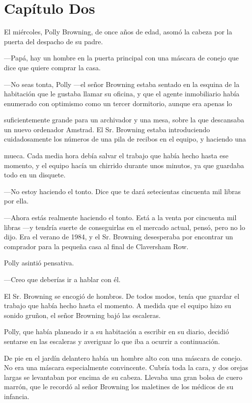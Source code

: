 \chapter*{Capítulo Dos} 

El miércoles, Polly Browning, de once años de edad, asomó la cabeza por la puerta del despacho de su padre.

---Papá, hay un hombre en la puerta principal con una máscara de conejo que dice que quiere comprar la casa.

---No seas tonta, Polly ---el señor Browning estaba sentado en la esquina de la habitación que le gustaba llamar su oficina, y que el agente inmobiliario había enumerado con optimismo como un tercer dormitorio, aunque era apenas lo

suficientemente grande para un archivador y una mesa, sobre la que descansaba un nuevo ordenador Amstrad. El Sr. Browning estaba introduciendo cuidadosamente los números de una pila de recibos en el equipo, y haciendo una

mueca. Cada media hora debía salvar el trabajo que había hecho hasta ese momento, y el equipo hacía un chirrido durante unos minutos, ya que guardaba todo en un disquete.

---No estoy haciendo el tonto. Dice que te dará setecientas cincuenta mil libras por ella.

---Ahora estás realmente haciendo el tonto. Está a la venta por cincuenta mil libras ---y tendría suerte de conseguirlas en el mercado actual, pensó, pero no lo dijo. Era el verano de 1984, y el Sr. Browning desesperaba por encontrar un comprador para la pequeña casa al final de Claversham Row.

Polly asintió pensativa.

---Creo que deberías ir a hablar con él.

El Sr. Browning se encogió de hombros. De todos modos, tenía que guardar el trabajo que había hecho hasta el momento. A medida que el equipo hizo su sonido gruñon, el señor Browning bajó las escaleras.

Polly, que había planeado ir a su habitación a escribir en su diario, decidió sentarse en las escaleras y averiguar lo que iba a ocurrir a continuación.

De pie en el jardín delantero había un hombre alto con una máscara de conejo. No era una máscara especialmente convincente. Cubría toda la cara, y dos orejas largas se levantaban por encima de su cabeza. Llevaba una gran bolsa de cuero marrón, que le recordó al señor Browning los maletines de los médicos de su infancia.

